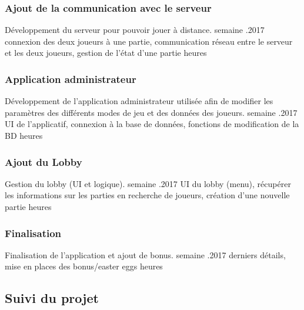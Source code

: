 \documentclass[a4paper,12pt]{article}
\begin{document}
	\subsubsection{Ajout de la communication avec le serveur}
	\begin{enumerate}[labelwidth=5em,leftmargin=8em]
		\objectif Développement du serveur pour pouvoir jouer à distance.
		 semaine
		.2017
		\partageTache connexion des deux joueurs à une partie, communication réseau entre le serveur et les deux joueurs, gestion de l'état d'une partie
		 heures
	\end{enumerate}

	\subsubsection{Application administrateur}
	\begin{enumerate}[labelwidth=5em,leftmargin=8em]
		\objectif Développement de l'application administrateur utilisée afin de modifier les paramètres des différents modes de jeu et des données des joueurs.
		 semaine
		.2017
		\partageTache UI de l'applicatif, connexion à la base de données, fonctions de modification de la BD
		 heures
	\end{enumerate}

	\subsubsection{Ajout du Lobby}
	\begin{enumerate}[labelwidth=5em,leftmargin=8em]
		\objectif Gestion du lobby (UI et logique).
		 semaine
		.2017
		\partageTache UI du lobby (menu), récupérer les informations sur les parties en recherche de joueurs, création d'une nouvelle partie
		 heures
	\end{enumerate}

	\subsubsection{Finalisation}
	\begin{enumerate}[labelwidth=5em,leftmargin=8em]
		\objectif Finalisation de l'application et ajout de bonus.
		 semaine
		.2017
		\partageTache derniers détails, mise en places des bonus/easter eggs
		 heures
	\end{enumerate}

	
	\subsection{Suivi du projet}
	
\end{document}
